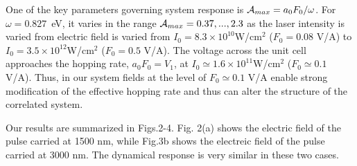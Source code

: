 \documentclass[prb,aps,twocolumn,showpacs,amsmath,amssymb]{revtex4}%
\newcommand{\w}{\omega}
\begin{document}

One of the key parameters governing system response is
${\cal A}_{max}=a_0F_0/\omega$. For  
$\w=0.827$~eV, it varies in the range 
${\cal A}_{max} = 0.37,..., 2.3$ as the laser intensity
is varied from 
electric field is varied from $I_0=8.3 \times 10^{10}$W/cm$^2$ 
($F_0=0.08$ V/A) 
to $I_0=3.5 \times 10^{12}$W/cm$^2$ 
($F_0=0.5$ V/A).  The voltage across the 
unit cell approaches the hopping rate, $a_0F_0=V_1$, at  
$I_0\simeq 1.6 \times 10^{11}$W/cm$^2$
($F_0\simeq 0.1$ V/A). Thus, in our system
fields at the level of $F_0\simeq 0.1$ V/A enable 
strong modification of the effective hopping rate and
thus can alter the structure of the correlated system.  


Our results are summarized in Figs.2-4. 
Fig. 2(a) shows the electric field of the 
pulse carried at 1500 nm, while Fig.3b shows
the electreic field of the pulse carried at 
3000 nm.  The dynamical response is very similar in
these two cases.
\end{document}
